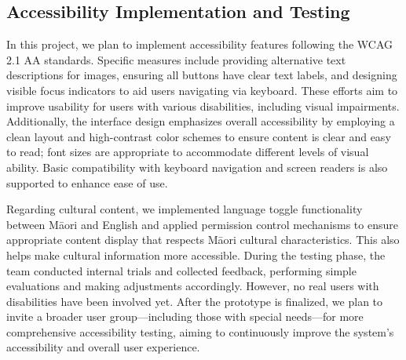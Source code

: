 ﻿%


\subsection{Accessibility Implementation and Testing}

In this project, we plan to implement accessibility features following the WCAG 2.1 AA standards. Specific measures include providing alternative text descriptions for images, ensuring all buttons have clear text labels, and designing visible focus indicators to aid users navigating via keyboard. These efforts aim to improve usability for users with various disabilities, including visual impairments. Additionally, the interface design emphasizes overall accessibility by employing a clean layout and high-contrast color schemes to ensure content is clear and easy to read; font sizes are appropriate to accommodate different levels of visual ability. Basic compatibility with keyboard navigation and screen readers is also supported to enhance ease of use.

Regarding cultural content, we implemented language toggle functionality between Māori and English and applied permission control mechanisms to ensure appropriate content display that respects Māori cultural characteristics. This also helps make cultural information more accessible. During the testing phase, the team conducted internal trials and collected feedback, performing simple evaluations and making adjustments accordingly. However, no real users with disabilities have been involved yet. After the prototype is finalized, we plan to invite a broader user group—including those with special needs—for more comprehensive accessibility testing, aiming to continuously improve the system’s accessibility and overall user experience.
